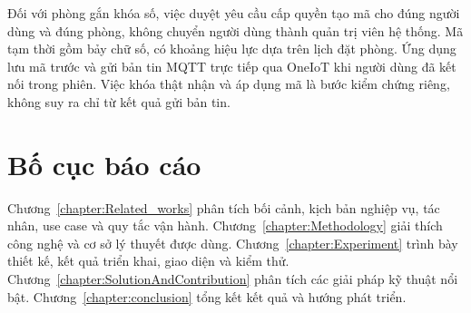 \documentclass[../DoAn.tex]{subfiles}
\begin{document}
Đối với phòng gắn khóa số, việc duyệt yêu cầu cấp quyền tạo mã cho đúng người dùng và đúng phòng, không chuyển người dùng thành quản trị viên hệ thống. Mã tạm thời gồm bảy chữ số, có khoảng hiệu lực dựa trên lịch đặt phòng. Ứng dụng lưu mã trước và gửi bản tin MQTT trực tiếp qua OneIoT khi người dùng đã kết nối trong phiên. Việc khóa thật nhận và áp dụng mã là bước kiểm chứng riêng, không suy ra chỉ từ kết quả gửi bản tin.

\section{Bố cục báo cáo}
\label{section:1.4}
Chương~\ref{chapter:Related_works} phân tích bối cảnh, kịch bản nghiệp vụ, tác nhân, use case và quy tắc vận hành. Chương~\ref{chapter:Methodology} giải thích công nghệ và cơ sở lý thuyết được dùng. Chương~\ref{chapter:Experiment} trình bày thiết kế, kết quả triển khai, giao diện và kiểm thử. Chương~\ref{chapter:SolutionAndContribution} phân tích các giải pháp kỹ thuật nổi bật. Chương~\ref{chapter:conclusion} tổng kết kết quả và hướng phát triển.
\end{document}
